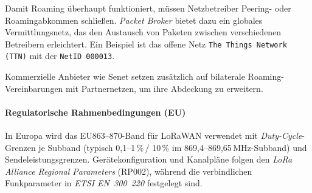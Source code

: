 Damit Roaming überhaupt funktioniert, müssen Netzbetreiber Peering- oder Roamingabkommen schließen. 
\emph{Packet Broker} bietet dazu ein globales Vermittlungsnetz, das den Austausch von Paketen zwischen verschiedenen Betreibern erleichtert. Ein Beispiel ist das offene Netz \texttt{The Things Network (TTN)} mit der \texttt{NetID~000013}. 

Kommerzielle Anbieter wie Senet setzen zusätzlich auf bilaterale Roaming-Vereinbarungen mit Partnernetzen, um ihre Abdeckung zu erweitern. \cite{LoRaWANBackendInterfaces11,PacketBroker,TTNNetID,SenetExt}


\paragraph*{Regulatorische Rahmenbedingungen (EU)}
In Europa wird das EU863–870-Band für LoRaWAN verwendet mit \emph{Duty-Cycle}-Grenzen je Subband (typisch 0{,}1–1\,\%\,/ 10\,\% im 869{,}4–869{,}65\,MHz-Subband) und Sendeleistungsgrenzen. Gerätekonfiguration und Kanalpläne folgen den \emph{LoRa Alliance Regional Parameters} (RP002), während die verbindlichen Funkparameter in \emph{ETSI EN~300~220} festgelegt sind. 
\autocite{RP002104, ETSIEN3002202025}